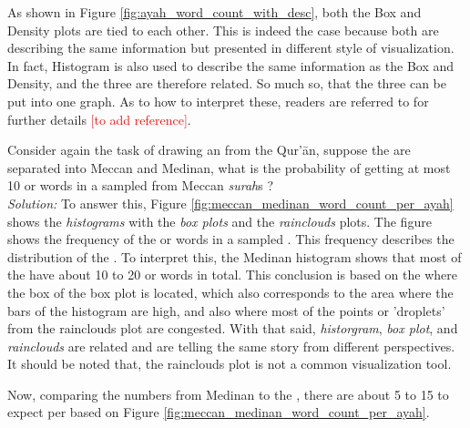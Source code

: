 As shown in Figure \ref{fig:ayah_word_count_with_desc}, both the Box and Density plots are tied to each other. This is indeed the case because both are describing the same information but presented in different style of visualization. In fact, Histogram is also used to describe the same information as the Box and Density, and the three are therefore related. So much so, that the three can be put into one graph. As to how to interpret these, readers are referred to for further details \textcolor{red}{[to add reference]}.
\begin{exmp}\label{ex:frequency_distribution}
Consider again the task of drawing an   from the Qur'\=an, suppose the   are separated into  Meccan and  Medinan, what is the probability of getting at most 10   or words in a sampled   from  Meccan \textit{surah}s ?\\
\textit{Solution:} To answer this, Figure \ref{fig:meccan_medinan_word_count_per_ayah} shows the \textit{histograms} with the \textit{box plots} and the \textit{rainclouds} plots. The figure shows the frequency of the   or words in a sampled  . This frequency describes the distribution of the  . To interpret this, the Medinan  histogram shows that most of the   have about 10 to 20   or words in total. This conclusion is based on the where the box of the box plot is located, which also corresponds to the area where the bars of the histogram are high, and also where most of the points or 'droplets' from the rainclouds plot are congested. With that said, \textit{historgram}, \textit{box plot}, and \textit{rainclouds} are related and are telling the same story from different perspectives. It should be noted that, the rainclouds plot is not a common visualization tool. 

Now, comparing the numbers from Medinan  to the  , there are about 5 to 15   to expect per   based on Figure \ref{fig:meccan_medinan_word_count_per_ayah}. 


\end{exmp}
